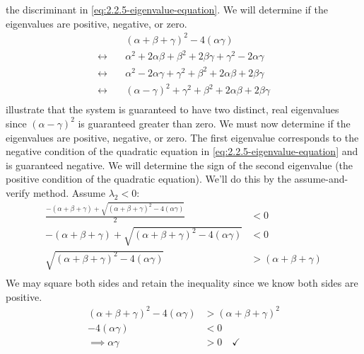 \documentclass[12pt]{article}
\begin{document}
the discriminant in \cref{eq:2.2.5-eigenvalue-equation}. We will determine if
the eigenvalues are positive, negative, or zero.
\begin{equation}
  \label{eq:2.2.5-positive-illustration}
  \begin{aligned}
    & {(\alpha+\beta+\gamma)}^2-4(\alpha\gamma) \\
    \longleftrightarrow\quad& \alpha^2 + 2\alpha\beta + \beta^2 + 2\beta\gamma +
    \gamma^2 - 2\alpha\gamma \\
    \longleftrightarrow\quad& \alpha^2 - 2\alpha\gamma + \gamma^2 + \beta^2 +
    2\alpha\beta + 2\beta\gamma \\
    \longleftrightarrow\quad& {(\alpha-\gamma)}^2 + \gamma^2 + \beta^2 + 2\alpha\beta +
    2\beta\gamma \\
  \end{aligned}
\end{equation}
 illustrate
that the system is guaranteed to have two distinct, real eigenvalues since
${(\alpha-\gamma)}^2$ is guaranteed greater than zero. We must now determine if
the eigenvalues are positive, negative, or zero. The first eigenvalue
corresponds to the negative condition of the quadratic equation in
\cref{eq:2.2.5-eigenvalue-equation} and is guaranteed negative. We will
determine the sign of the second eigenvalue (the positive condition of the
quadratic equation). We'll do this by the assume-and-verify method. Assume
$\lambda_2<0$:
\begin{equation*}
  \begin{aligned}
    \frac{-(\alpha+\beta+\gamma)+\sqrt{{(\alpha+\beta+\gamma)}^2-4(\alpha\gamma)}}{2} &<0 \\
    -(\alpha+\beta+\gamma)+\sqrt{{(\alpha+\beta+\gamma)}^2-4(\alpha\gamma)} &<0 \\
    \sqrt{{(\alpha+\beta+\gamma)}^2-4(\alpha\gamma)} &> (\alpha+\beta+\gamma) \\
  \end{aligned}
\end{equation*}
We may square both sides and retain the inequality since we know both sides are
positive.
\begin{equation}
  \begin{aligned}
    {(\alpha+\beta+\gamma)}^2-4(\alpha\gamma) &> {(\alpha+\beta+\gamma)}^2 \\
    -4(\alpha\gamma) &< 0 \\
    \implies \alpha\gamma &> 0 \quad\checkmark
  \end{aligned}
\end{equation}
\end{document}
